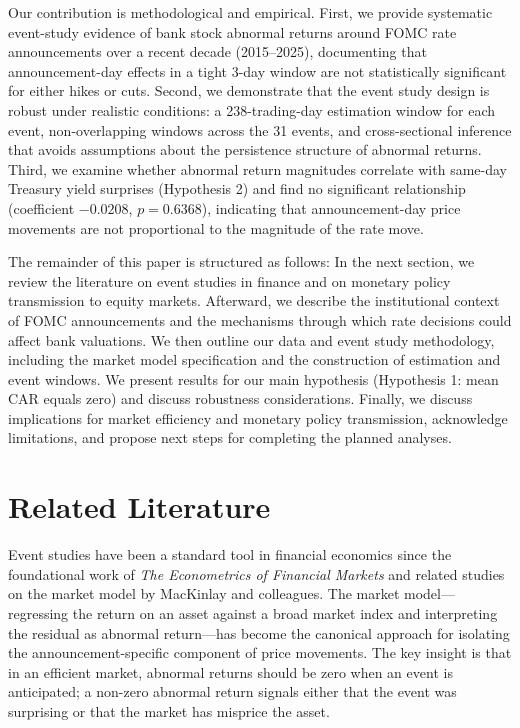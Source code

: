 \documentclass[11pt]{article}
\begin{document}
Our contribution is methodological and empirical. First, we provide systematic event-study evidence of bank stock abnormal returns around FOMC rate announcements over a recent decade (2015--2025), documenting that announcement-day effects in a tight 3-day window are not statistically significant for either hikes or cuts. Second, we demonstrate that the event study design is robust under realistic conditions: a 238-trading-day estimation window for each event, non-overlapping windows across the 31 events, and cross-sectional inference that avoids assumptions about the persistence structure of abnormal returns. Third, we examine whether abnormal return magnitudes correlate with same-day Treasury yield surprises (Hypothesis 2) and find no significant relationship (coefficient $-0.0208$, $p = 0.6368$), indicating that announcement-day price movements are not proportional to the magnitude of the rate move.

The remainder of this paper is structured as follows: In the next section, we review the literature on event studies in finance and on monetary policy transmission to equity markets. Afterward, we describe the institutional context of FOMC announcements and the mechanisms through which rate decisions could affect bank valuations. We then outline our data and event study methodology, including the market model specification and the construction of estimation and event windows. We present results for our main hypothesis (Hypothesis 1: mean CAR equals zero) and discuss robustness considerations. Finally, we discuss implications for market efficiency and monetary policy transmission, acknowledge limitations, and propose next steps for completing the planned analyses.

\section{Related Literature}

Event studies have been a standard tool in financial economics since the foundational work of \textit{The Econometrics of Financial Markets} and related studies on the market model by MacKinlay and colleagues. The market model—regressing the return on an asset against a broad market index and interpreting the residual as abnormal return—has become the canonical approach for isolating the announcement-specific component of price movements. The key insight is that in an efficient market, abnormal returns should be zero when an event is anticipated; a non-zero abnormal return signals either that the event was surprising or that the market has misprice the asset.
\end{document}
